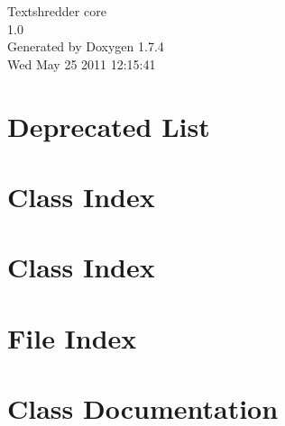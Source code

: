 \documentclass[a4paper]{book}
\begin{document}
\hypersetup{pageanchor=false}
\begin{titlepage}
\vspace*{7cm}
\begin{center}
{\Large Textshredder core \\[1ex]\large 1.0 }\\
\vspace*{1cm}
{\large Generated by Doxygen 1.7.4}\\
\vspace*{0.5cm}
{\small Wed May 25 2011 12:15:41}\\
\end{center}
\end{titlepage}
\clearemptydoublepage
{}
\tableofcontents
\clearemptydoublepage
{}
\hypersetup{pageanchor=true}
\chapter{Deprecated List}
\label{deprecated}
\hypertarget{deprecated}{}

\chapter{Class Index}

\chapter{Class Index}

\chapter{File Index}

\chapter{Class Documentation}





































\end{document}
